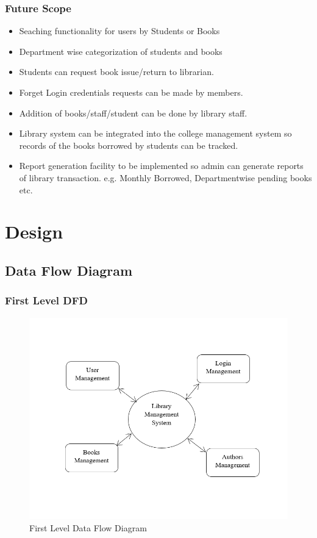 \subsection{Future Scope}
\begin{itemize}
	\item Seaching functionality for users by Students or Books
	\item Department wise categorization of students and books
	\item Students can request book issue/return to librarian.
	\item Forget Login credentials requests can be made by members.
	\item Addition of books/staff/student can be done by library staff.
	\item Library system can be integrated into the college management system so records of the books borrowed by students can be tracked.
	\item Report generation facility to be implemented so admin can generate reports of library transaction.
	e.g. Monthly Borrowed, Departmentwise pending books etc.
	
\end{itemize}

\chapter{Design}

\section{Data Flow Diagram}
\subsection{First Level DFD}
\begin{figure}[htb]
	\centering
	\includegraphics[scale=0.8]{./dfd-0} 
	\caption{First Level Data Flow Diagram}
	\label{fig:label} 
\end{figure}
